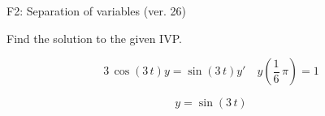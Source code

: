 \begin{exercise}
  \begin{exerciseTitle}F2: Separation of variables (ver. 26)\end{exerciseTitle}
  \begin{exerciseStatement}
    
Find the solution to the given IVP.

    
\[3 \, \cos\left(3 \, t\right) y= \sin\left(3 \, t\right) y'\hspace{1em} y\left( \frac{1}{6} \, \pi \right)= 1\]

  \end{exerciseStatement}
  \begin{exerciseAnswer}
    
\[y= \sin\left(3 \, t\right)\]

  \end{exerciseAnswer}
\end{exercise}